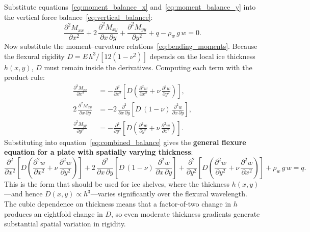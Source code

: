 \documentclass[11pt]{article}
\begin{document}
Substitute equations~\eqref{eq:moment_balance_x} and~\eqref{eq:moment_balance_y} into the vertical force balance~\eqref{eq:vertical_balance}:
\begin{equation}
  \frac{\partial^2 M_{xx}}{\partial x^2} + 2\,\frac{\partial^2 M_{xy}}{\partial x\,\partial y} + \frac{\partial^2 M_{yy}}{\partial y^2} + q - \rho_w\,g\,w = 0.
  \label{eq:combined_balance}
\end{equation}
Now substitute the moment--curvature relations~\eqref{eq:bending_moments}.  Because the flexural rigidity $D = E\,h^3/[12(1-\nu^2)]$ depends on the local ice thickness $h(x,y)$, $D$ must remain inside the derivatives.  Computing each term with the product rule:
\begin{align}
  \frac{\partial^2 M_{xx}}{\partial x^2} &= -\frac{\partial^2}{\partial x^2}\!\left[D\!\left(\frac{\partial^2 w}{\partial x^2} + \nu\,\frac{\partial^2 w}{\partial y^2}\right)\right], \nonumber \\[4pt]
  2\,\frac{\partial^2 M_{xy}}{\partial x\,\partial y} &= -2\,\frac{\partial^2}{\partial x\,\partial y}\!\left[D\,(1-\nu)\,\frac{\partial^2 w}{\partial x\,\partial y}\right], \nonumber \\[4pt]
  \frac{\partial^2 M_{yy}}{\partial y^2} &= -\frac{\partial^2}{\partial y^2}\!\left[D\!\left(\frac{\partial^2 w}{\partial y^2} + \nu\,\frac{\partial^2 w}{\partial x^2}\right)\right].
  \label{eq:moment_derivatives}
\end{align}
Substituting into equation~\eqref{eq:combined_balance} gives the \textbf{general flexure equation for a plate with spatially varying thickness}:
\begin{equation}
  \boxed{\frac{\partial^2}{\partial x^2}\!\left[D\!\left(\frac{\partial^2 w}{\partial x^2} + \nu\,\frac{\partial^2 w}{\partial y^2}\right)\right] + 2\,\frac{\partial^2}{\partial x\,\partial y}\!\left[D\,(1-\nu)\,\frac{\partial^2 w}{\partial x\,\partial y}\right] + \frac{\partial^2}{\partial y^2}\!\left[D\!\left(\frac{\partial^2 w}{\partial y^2} + \nu\,\frac{\partial^2 w}{\partial x^2}\right)\right] + \rho_w\,g\,w = q.}
  \label{eq:plate_flexure_variable_D}
\end{equation}
This is the form that should be used for ice shelves, where the thickness $h(x,y)$---and hence $D(x,y) \propto h^3$---varies significantly over the flexural wavelength.  The cubic dependence on thickness means that a factor-of-two change in $h$ produces an eightfold change in $D$, so even moderate thickness gradients generate substantial spatial variation in rigidity.
\end{document}
